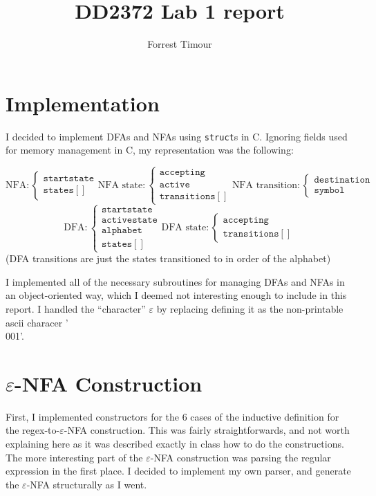 \documentclass{article}
\title{DD2372 Lab 1 report}
\author{Forrest Timour}
\begin{document}
\maketitle

\section*{Implementation}
I decided to implement DFAs and NFAs using \texttt{struct}s in C. Ignoring fields used for memory management in C, my representation was the following:

\[\text{NFA}:\begin{cases}
\mathtt{start state}\\
\mathtt{states[]}
\end{cases}
\text{NFA state}:\begin{cases}
\mathtt{accepting}\\
\mathtt{active}\\
\mathtt{transitions[]}
\end{cases}
\text{NFA transition}:\begin{cases}
\mathtt{destination}\\
\mathtt{symbol}
\end{cases}\]
\[\text{DFA}:\begin{cases}
\mathtt{start state}\\
\mathtt{active state}\\
\mathtt{alphabet}\\
\mathtt{states[]}
\end{cases}
\text{DFA state}:\begin{cases}
\mathtt{accepting}\\
\mathtt{transitions[]}
\end{cases}\]
(DFA transitions are just the states transitioned to in order of the alphabet)

I implemented all of the necessary subroutines for managing DFAs and NFAs in an object-oriented way, which I deemed not interesting enough to include in this report. I handled the ``character'' $\varepsilon$ by replacing defining it as the non-printable ascii characer '\\001'.

\section*{$\varepsilon$-NFA Construction}
First, I implemented constructors for the 6 cases of the inductive definition for the regex-to-$\varepsilon$-NFA construction. This was fairly straightforwards, and not worth explaining here as it was described exactly in class how to do the constructions. The more interesting part of the $\varepsilon$-NFA construction was parsing the regular expression in the first place. I decided to implement my own parser, and generate the $\varepsilon$-NFA structurally as I went.
\end{document}
